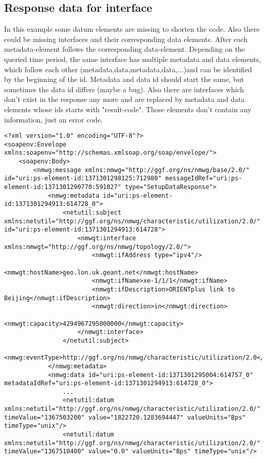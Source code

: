\documentclass[a4paper,12pt,titlepage,hidelinks,fleqn]{article}
\begin{document}
\subsection{Response data for interface}
\begin{flushleft}
In this example some datum elements are missing to shorten the code. Also there could be missing interfaces and their corresponding data elements.
After each metadata-element follows  the corresponding data-element. Depending on the queried time period, the same interface has multiple metadata and data elements, which follow each other (metadata,data,metadata,data,...)and can be identified by the beginning of the id. Metadata and data id should start the same, but sometimes the data id differs (maybe a bug).\newline
Also there are interfaces which don't exist in the response any more and are replaced by metadata and data elements whose ids starts with "result-code". Those elements don't contain any information, just an error code. 
\begin{framed}
\begin{lstlisting}
<?xml version="1.0" encoding="UTF-8"?>
<soapenv:Envelope xmlns:soapenv="http://schemas.xmlsoap.org/soap/envelope/">
	<soapenv:Body>
		<nmwg:message xmlns:nmwg="http://ggf.org/ns/nmwg/base/2.0/" id="uri:ps-element-id:1371301298125:712980" messageIdRef="uri:ps-element-id:1371301290770:591827" type="SetupDataResponse">
			<nmwg:metadata id="uri:ps-element-id:1371301294913:614728_0">
				<netutil:subject xmlns:netutil="http://ggf.org/ns/nmwg/characteristic/utilization/2.0/" id="uri:ps-element-id:1371301294913:614728">
					<nmwgt:interface xmlns:nmwgt="http://ggf.org/ns/nmwg/topology/2.0/">
						<nmwgt:ifAddress type="ipv4"/>
						<nmwgt:hostName>geo.lon.uk.geant.net</nmwgt:hostName>
						<nmwgt:ifName>xe-1/1/1</nmwgt:ifName>
						<nmwgt:ifDescription>ORIENTplus link to Beijing</nmwgt:ifDescription>
						<nmwgt:direction>in</nmwgt:direction>
						<nmwgt:capacity>4294967295000000</nmwgt:capacity>
					</nmwgt:interface>
				</netutil:subject>
				<nmwg:eventType>http://ggf.org/ns/nmwg/characteristic/utilization/2.0</nmwg:eventType>
			</nmwg:metadata>
			<nmwg:data id="uri:ps-element-id:1371301295004:614757_0" metadataIdRef="uri:ps-element-id:1371301294913:614728_0">
				...
				<netutil:datum xmlns:netutil="http://ggf.org/ns/nmwg/characteristic/utilization/2.0/" timeValue="1367503200" value="1822720.1283694447" valueUnits="Bps" timeType="unix"/>
				<netutil:datum xmlns:netutil="http://ggf.org/ns/nmwg/characteristic/utilization/2.0/" timeValue="1367510400" value="0.0" valueUnits="Bps" timeType="unix"/>

\end{lstlisting}
\end{framed}
\end{flushleft}
\end{document}
